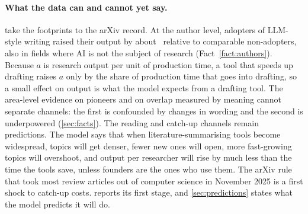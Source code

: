 \paragraph{What the data can and cannot yet say.} 
take the footprints to the arXiv record. At the author level, adopters of
LLM-style writing raised their output by about \empLLMallPct\ relative to
comparable non-adopters, also in fields where AI is not the subject of research
(Fact~\ref{fact:authors}). Because $a$ is research output per unit of
production time, a tool that speeds up drafting raises $a$ only by the share
of production time that goes into drafting, so a small effect on output is
what the model expects from a drafting tool. The area-level evidence on
pioneers and on overlap measured by meaning cannot separate channels: the
first is confounded by changes in wording and the second is underpowered
(\cref{sec:facts}). The reading and catch-up channels remain predictions. The
model says that when literature-summarising tools become widespread, topics
will get denser, fewer new ones will open, more fast-growing topics will
overshoot, and output per researcher will rise by much less than the time the
tools save, unless founders are the ones who use them. The arXiv rule that took
most review articles out of computer science in November 2025 is a first shock
to catch-up costs.  reports its first stage, and
\cref{sec:predictions} states what the model predicts it will do.
